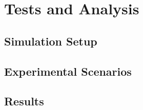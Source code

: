 \chapter{Tests and Analysis}

\section{Simulation Setup}


\section{Experimental Scenarios}


\section{Results}
